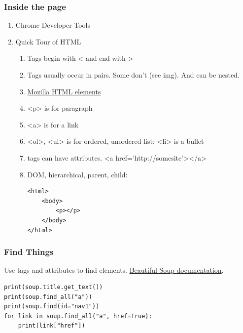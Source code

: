 \documentclass[compress, black]{beamer}
\begin{document}
\begin{frame}[fragile]
  \frametitle{Inside the page}
  \begin{enumerate}
    \item[-]<1->Chrome Developer Tools
    \item[-]<2->Quick Tour of HTML
      \begin{enumerate}
      \item[-]<3->Tags begin with < and end with >
      \item[-]<4->Tags usually occur in pairs. Some don't (see img). And can be nested.
      \item[-]<5->\href{https://developer.mozilla.org/en-US/docs/Web/HTML/Element}{Mozilla HTML elements}
      \item[-]<6-><p> is for paragraph
      \item[-]<7-><a> is for a link
      \item[-]<8-><ol>, <ul> is for ordered, unordered list; <li> is a bullet
      \item[-]<9->tags can have attributes. <a href='http://somesite'></a>
      \item[-]<10->DOM, hierarchical, parent, child:
            \begin{verbatim}
<html>
    <body>
        <p></p>
    </body>
</html>
\end{verbatim}
    \end{enumerate}
  \end{enumerate}
\end{frame}

\begin{frame}[fragile]
\frametitle{Find Things}
Use tags and attributes to find elements. \href{https://www.crummy.com/software/BeautifulSoup/bs4/doc/}{Beautiful Soup documentation}.
\small
\begin{verbatim}
print(soup.title.get_text())
print(soup.find_all("a"))
print(soup.find(id="nav1"))
for link in soup.find_all("a", href=True):
    print(link["href"])
\end{verbatim}
\end{frame}

\end{document}
